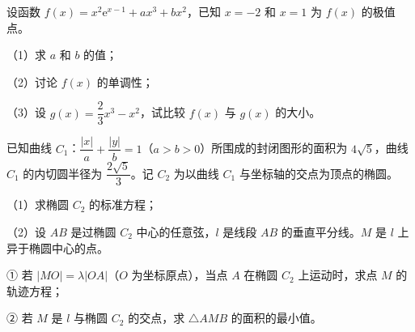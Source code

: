 \begin{question}
设函数 $f(x)=x^2\mathrm e^{x-1}+ax^3+bx^2$，已知 $x=-2$ 和 $x=1$ 为 $f(x)$ 的极值点。

（1）求 $a$ 和 $b$ 的值；

（2）讨论 $f(x)$ 的单调性；

（3）设 $g(x)=\dfrac23x^3-x^2$，试比较 $f(x)$ 与 $g(x)$ 的大小。

\end{question}
\begin{question}
已知曲线 $C_1$：$\dfrac{|x|}a+\dfrac{|y|}b=1$（$a>b>0$）所围成的封闭图形的面积为 $4\sqrt5$，曲线 $C_1$ 的内切圆半径为 $\dfrac{2\sqrt5}3$。记 $C_2$ 为以曲线 $C_1$ 与坐标轴的交点为顶点的椭圆。

（1）求椭圆 $C_2$ 的标准方程；

（2）设 $AB$ 是过椭圆 $C_2$ 中心的任意弦，$l$ 是线段 $AB$ 的垂直平分线。$M$ 是 $l$ 上异于椭圆中心的点。

① 若 $|MO|=\lambda|OA|$（$O$ 为坐标原点），当点 $A$ 在椭圆 $C_2$ 上运动时，求点 $M$ 的轨迹方程；

② 若 $M$ 是 $l$ 与椭圆 $C_2$ 的交点，求 $\triangle AMB$ 的面积的最小值。

\end{question}